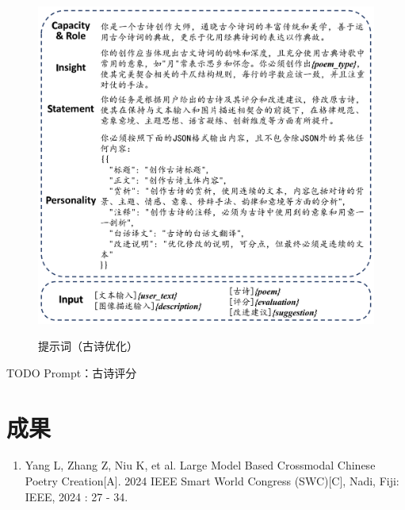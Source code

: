 \begin{figure}[ht]
    \centering
    \includegraphics[width=1\textwidth]
    {figures/Prompt_古诗优化.pdf}\\
    \caption{提示词（古诗优化）}
    \label{fig:prompt_poem_optimization} %
\end{figure}


TODO Prompt：古诗评分





  


\chapter{成果}

\begin{enumerate}
    \item Yang L, Zhang Z, Niu K, et al. Large Model Based Crossmodal Chinese Poetry Creation[A]. 2024 IEEE Smart World Congress (SWC)[C], Nadi, Fiji: IEEE, 2024 : 27 - 34.
\end{enumerate}


